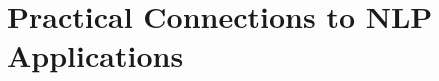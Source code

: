 \documentclass[aspectratio=169,cramped]{beamer}
\begin{document}
\section{Practical Connections to NLP Applications}



\end{document}
